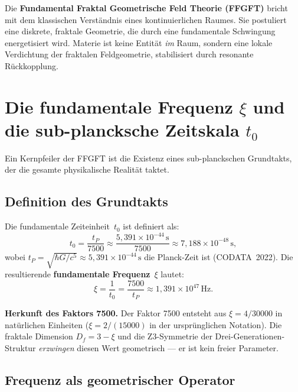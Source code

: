 Die \textbf{Fundamental Fraktal Geometrische Feld Theorie (FFGFT)} bricht mit
dem klassischen Verständnis eines kontinuierlichen Raumes. Sie postuliert eine
diskrete, fraktale Geometrie, die durch eine fundamentale Schwingung energetisiert
wird. Materie ist keine Entität \emph{im} Raum, sondern eine lokale Verdichtung
der fraktalen Feldgeometrie, stabilisiert durch resonante Rückkopplung.

\section{Die fundamentale Frequenz $\xi$ und die sub-plancksche Zeitskala $t_0$}

Ein Kernpfeiler der FFGFT ist die Existenz eines sub-planckschen Grundtakts,
der die gesamte physikalische Realität taktet.

\subsection{Definition des Grundtakts}

Die fundamentale Zeiteinheit~$t_0$ ist definiert als:
\begin{equation}
  t_0 = \frac{t_P}{7500}
      \approx \frac{5{,}391 \times 10^{-44}\,\text{s}}{7500}
      \approx 7{,}188 \times 10^{-48}\,\text{s},
  \label{eq:t0}
\end{equation}
wobei $t_P = \sqrt{\hbar G/c^5} \approx 5{,}391 \times 10^{-44}\,\text{s}$
die Planck-Zeit ist (CODATA~2022). Die resultierende \textbf{fundamentale
Frequenz}~$\xi$ lautet:
\begin{equation}
  \xi = \frac{1}{t_0} = \frac{7500}{t_P}
      \approx 1{,}391 \times 10^{47}\,\text{Hz}.
  \label{eq:xi}
\end{equation}

\begin{keybox}
\textbf{Herkunft des Faktors 7500.}\;
Der Faktor 7500 entsteht aus $\xi = 4/30000$ in natürlichen Einheiten
($\xi = 2/(15000)$ in der ursprünglichen Notation). Die fraktale Dimension
$D_f = 3 - \xi$ und die Z3-Symmetrie der Drei-Generationen-Struktur
\emph{erzwingen} diesen Wert geometrisch — er ist kein freier Parameter.
\end{keybox}

\subsection{Frequenz als geometrischer Operator}

